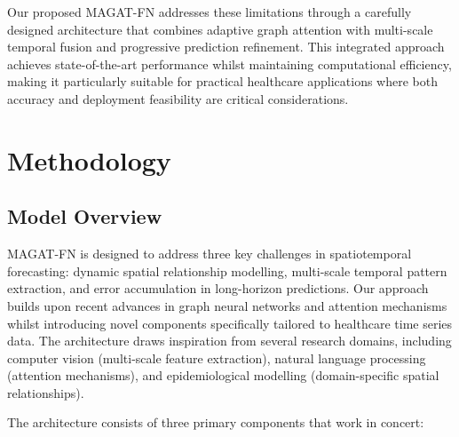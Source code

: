 \documentclass[lettersize, journal]{IEEEtran}
\begin{document}
Our proposed MAGAT-FN addresses these limitations through a carefully designed architecture that combines adaptive graph attention with multi-scale temporal fusion and progressive prediction refinement. This integrated approach achieves state-of-the-art performance whilst maintaining computational efficiency, making it particularly suitable for practical healthcare applications where both accuracy and deployment feasibility are critical considerations.

\section{Methodology}
\label{sec:methodology}

\subsection{Model Overview}
MAGAT-FN is designed to address three key challenges in spatiotemporal forecasting: dynamic spatial relationship modelling, multi-scale temporal pattern extraction, and error accumulation in long-horizon predictions. Our approach builds upon recent advances in graph neural networks and attention mechanisms whilst introducing novel components specifically tailored to healthcare time series data. The architecture draws inspiration from several research domains, including computer vision (multi-scale feature extraction), natural language processing (attention mechanisms), and epidemiological modelling (domain-specific spatial relationships).

The architecture consists of three primary components that work in concert:
\end{document}
